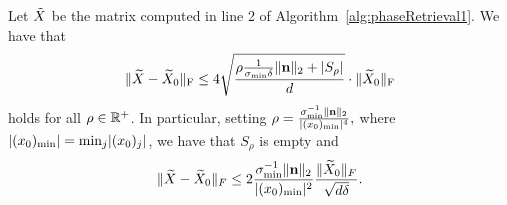 
\begin{lemma}
Let $\tilde{X}$ be the matrix computed in line 2 of Algorithm~\ref{alg:phaseRetrieval1}.  We have that \begin{equation}\| \widetilde{X} - \widetilde{X}_0 \|_{\rm F} \leq 4 \sqrt{\frac{\rho \frac{1}{\sigma_{\min} \delta} \| \mathbf n \|_2 + \left| S_\rho \right|}{d}} \cdot \| \widetilde{X}_0 \|_{\rm F}\label{eq:rho_bound}\end{equation} holds for all $\rho \in \mathbb{R}^+$.  In particular, setting $\rho = \frac{\sigma_{\min}^{-1} \lVert\mathbf n\rVert_2}{\lvert(x_0)_{\min}\rvert^4},$ where $\lvert(x_0)_{\min}\rvert = \min_j \lvert(x_0)_j\rvert$, we have that $S_\rho$ is empty and \begin{equation} \lVert\widetilde{X} - \widetilde{X}_0\rVert_F \le 2 \frac{\sigma_{\min}^{-1} \lVert\mathbf n\rVert_2}{\lvert(x_0)_{\min}\rvert^2} \frac{\lVert\widetilde{X}_0\rVert_F}{\sqrt{d \delta}}.\label{eq:empty_rho}\end{equation}
\label{lem:EtaBound}
\end{lemma}

